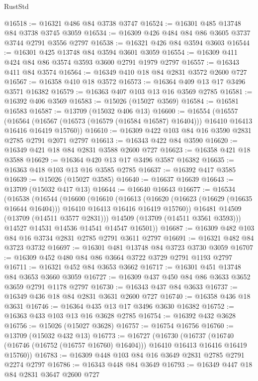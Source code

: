 \begin{lexlean}{RustStd}
\begin{coremodule}
@16518 := @16321 @486 @84 @3738 @3747
@16524 := @16301 @485 @13748 @84 @3738 @3745 @3059
@16534 := @16309 @426 @484 @84 @86 @3605 @3737 @3744 @2791 @3556 @2797
@16538 := @16321 @426 @84 @3594 @3603
@16544 := @16301 @425 @13748 @84 @3594 @3601 @3059
@16554 := @16309 @411 @424 @84 @86 @3574 @3593 @3600 @2791 @1979 @2797
@16557 := @16343 @411 @84 @3574
@16564 := @16349 @410 @18 @84 @2831 @3572 @2600 @727
@16567 := @16358 @410 @18 @3572
@16573 := @16364 @409 @13 @17 @3496 @3571 @16382
@16579 := @16363 @407 @103 @13 @16 @3569 @2785
@16581 := @16392 @406 @3569
@16583 := @15026 (@15027 @3569)
@16584 := @16581 @16583
@16587 := @13709 (@15032 @406 @13)
@16600 := @16554
    (@16557
      (@16564 (@16567 (@16573 (@16579 (@16584 @16587) @16404))) @16410 @16413 @16416 @16419 @15760))
@16610 := @16309 @422 @103 @84 @16 @3590 @2831 @2785 @2791 @2071 @2797
@16613 := @16343 @422 @84 @3590
@16620 := @16349 @421 @18 @84 @2831 @3588 @2600 @727
@16623 := @16358 @421 @18 @3588
@16629 := @16364 @420 @13 @17 @3496 @3587 @16382
@16635 := @16363 @418 @103 @13 @16 @3585 @2785
@16637 := @16392 @417 @3585
@16639 := @15026 (@15027 @3585)
@16640 := @16637 @16639
@16643 := @13709 (@15032 @417 @13)
@16644 := @16640 @16643
@16677 := @16534
    (@16538
      (@16544
        (@16600
          (@16610
            (@16613
              (@16620 (@16623 (@16629 (@16635 @16644 @16404))) @16410 @16413 @16416 @16419 @15760))
            @16481
            @14509
            (@13709 (@14511 @3577 @2831)))
          @14509
          (@13709 (@14511 @3561 @3593)))
        @14527
        @14531
        @14536
        @14541
        @14547
        @16501))
@16687 := @16309 @482 @103 @84 @16 @3734 @2831 @2785 @2791 @3611 @2797
@16691 := @16321 @482 @84 @3723 @3732
@16697 := @16301 @481 @13748 @84 @3723 @3730 @3059
@16707 := @16309 @452 @480 @84 @86 @3664 @3722 @3729 @2791 @1193 @2797
@16711 := @16321 @452 @84 @3653 @3662
@16717 := @16301 @451 @13748 @84 @3653 @3660 @3059
@16727 := @16309 @437 @450 @84 @86 @3633 @3652 @3659 @2791 @1178 @2797
@16730 := @16343 @437 @84 @3633
@16737 := @16349 @436 @18 @84 @2831 @3631 @2600 @727
@16740 := @16358 @436 @18 @3631
@16746 := @16364 @435 @13 @17 @3496 @3630 @16382
@16752 := @16363 @433 @103 @13 @16 @3628 @2785
@16754 := @16392 @432 @3628
@16756 := @15026 (@15027 @3628)
@16757 := @16754 @16756
@16760 := @13709 (@15032 @432 @13)
@16773 := @16727
    (@16730
      (@16737 (@16740 (@16746 (@16752 (@16757 @16760) @16404))) @16410 @16413 @16416 @16419 @15760))
@16783 := @16309 @448 @103 @84 @16 @3649 @2831 @2785 @2791 @2274 @2797
@16786 := @16343 @448 @84 @3649
@16793 := @16349 @447 @18 @84 @2831 @3647 @2600 @727

\end{coremodule}
\end{lexlean}
